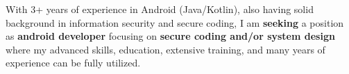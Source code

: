 

\begin{cvparagraph}


With 3+ years of experience in Android (Java/Kotlin), also having solid background in information security and secure coding, I am \textbf{seeking} a position as \textbf{android developer} focusing on \textbf{secure coding and/or system design} where my advanced skills, education, extensive training, and many years of experience can be fully utilized.

\end{cvparagraph}
